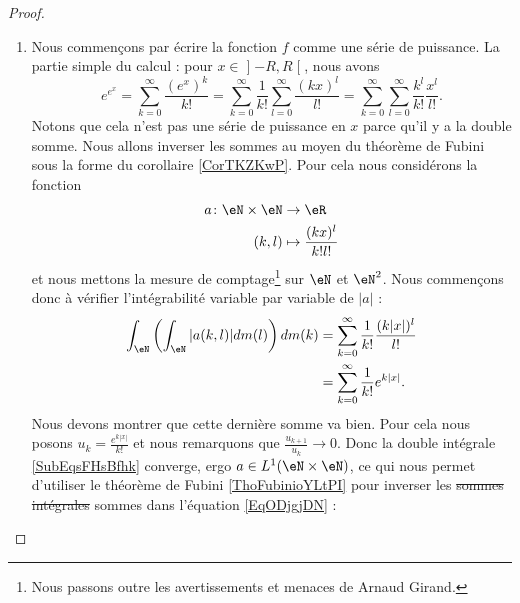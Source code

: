 \begin{proof}
\begin{enumerate}
                \item

                    Nous commençons par écrire la fonction \( f\) comme une série de puissance. La partie simple du calcul : pour \( x\in \mathopen] -R , R \mathclose[\), nous avons
                        \begin{equation}    \label{EqODjgjDN}
                        e^{e^x}=\sum_{k=0}^{\infty}\frac{ (e^x)^k }{ k! }=\sum_{k=0}^{\infty}\frac{1}{ k! }\sum_{l=0}^{\infty}\frac{ (kx)^l }{ l! }=\sum_{k=0}^{\infty}\sum_{l=0}^{\infty}\frac{k^l}{k! }\frac{ x^l }{ l! }.
                    \end{equation}
                    Notons que cela n'est pas une série de puissance en \( x\) parce qu'il y a la double somme. Nous allons inverser les sommes au moyen du théorème de Fubini sous la forme du corollaire \ref{CorTKZKwP}. Pour cela nous considérons la fonction
                    \begin{equation}
                        \begin{aligned}
                            a\colon \eN\times \eN&\to \eR \\
                            (k,l)&\mapsto \frac{ (kx)^l }{ k!l! } 
                        \end{aligned}
                    \end{equation}
                    et nous mettons la mesure de comptage\footnote{Nous passons outre les avertissements et menaces de Arnaud Girand.} sur \( \eN\) et \( \eN^2\). Nous commençons donc à vérifier l'intégrabilité variable par variable de \( | a |\) :
                    \begin{subequations}    \label{SubEqsFHsBfhk}
                        \begin{align}
                            \int_{\eN}\left( \int_{\eN}| a(k,l) |dm(l) \right)dm(k)&=\sum_{k=0}^{\infty}\frac{1}{ k! }\frac{ (k| x |)^l }{ l! }\\
                            &=\sum_{k=0}^{\infty}\frac{1}{ k! } e^{k| x |}.
                        \end{align}
                    \end{subequations}
                    Nous devons montrer que cette dernière somme va bien. Pour cela nous posons \( u_k=\frac{ e^{k| x |} }{ k! }\) et nous remarquons que \( \frac{ u_{k+1} }{ u_k }\to 0\). Donc la double intégrale \eqref{SubEqsFHsBfhk} converge, ergo \( a\in L^1(\eN\times \eN)\), ce qui nous permet d'utiliser le théorème de Fubini \ref{ThoFubinioYLtPI} pour inverser les \sout{sommes} \sout{intégrales} sommes dans l'équation \ref{EqODjgjDN} :

\end{enumerate}
\end{proof}
